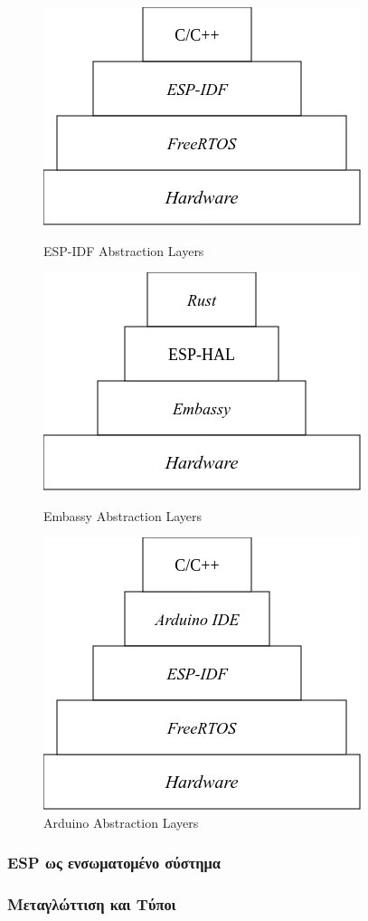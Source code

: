 \begin{figure}[!htb]
    \centering
    \begin{minipage}{0.49\textwidth}
        \centering
        \includegraphics[scale=0.4]{images/introduction/idf_layers}
        \caption{ESP-IDF Abstraction Layers}
        \label{fig:idf_layers}
      \end{minipage}  
    \begin{minipage}{0.49\textwidth}
        \centering
        \includegraphics[scale=0.4]{images/introduction/rust_layers}
        \caption{Embassy Abstraction Layers}
        \label{fig:rust_layers}
      \end{minipage}  
    \begin{minipage}{0.49\textwidth}
      \centering
        \vspace{0.5cm}
        \includegraphics[scale=0.4]{images/introduction/arduino_layers}
        \caption{Arduino Abstraction Layers}
        \label{fig:arduino_layers}
    \end{minipage}%
\end{figure}

\subsubsection{ESP ως ενσωματομένο σύστημα}

\subsubsection{Μεταγλώττιση και Τύποι}

